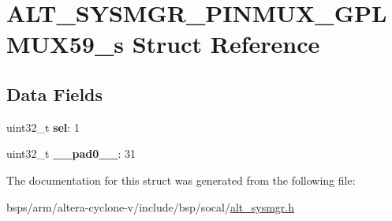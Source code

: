 \hypertarget{structALT__SYSMGR__PINMUX__GPLMUX59__s}{}\section{A\+L\+T\+\_\+\+S\+Y\+S\+M\+G\+R\+\_\+\+P\+I\+N\+M\+U\+X\+\_\+\+G\+P\+L\+M\+U\+X59\+\_\+s Struct Reference}
\label{structALT__SYSMGR__PINMUX__GPLMUX59__s}
\subsection*{Data Fields}
\begin{DoxyCompactItemize}
\item 
\mbox{\label{structALT__SYSMGR__PINMUX__GPLMUX59__s_a3408c9303827ae0ea31c2e3d69b2cabb}} 
uint32\+\_\+t {\bfseries sel}\+: 1
\item 
\mbox{\label{structALT__SYSMGR__PINMUX__GPLMUX59__s_aa601e1b0a8057edc90b1581605a28143}} 
uint32\+\_\+t {\bfseries \+\_\+\+\_\+pad0\+\_\+\+\_\+}\+: 31
\end{DoxyCompactItemize}


The documentation for this struct was generated from the following file\+:\begin{DoxyCompactItemize}
\item 
bsps/arm/altera-\/cyclone-\/v/include/bsp/socal/\mbox{\hyperlink{alt__sysmgr_8h}{alt\+\_\+sysmgr.\+h}}\end{DoxyCompactItemize}
